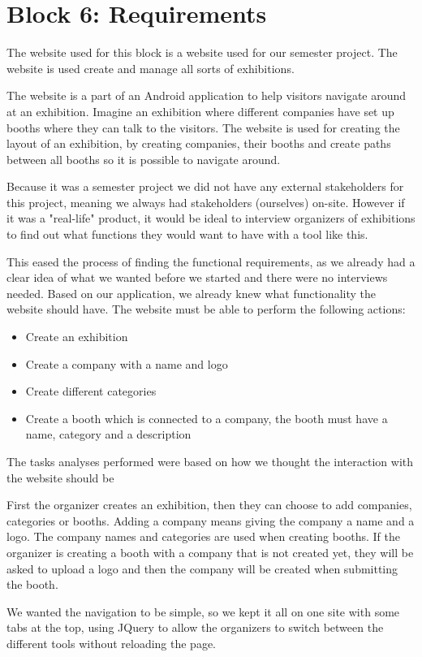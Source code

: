 \section*{Block 6: Requirements}

The website used for this block is a website used for our semester project. The website is used create and manage all sorts of exhibitions. 

The website is a part of an Android application to help visitors navigate around at an exhibition. Imagine an exhibition where different companies have set up booths where they can talk to the visitors. The website is used for creating the layout of an exhibition, by creating companies, their booths and create paths between all booths so it is possible to navigate around. 

Because it was a semester project we did not have any external stakeholders for this project, meaning we always had stakeholders (ourselves) on-site. However if it was a "real-life" product, it would be ideal to interview organizers of exhibitions to find out what functions they would want to have with a tool like this.

This eased the process of finding the functional requirements, as we already had a clear idea of what we wanted before we started and there were no interviews needed. Based on our application, we already knew what functionality the website should have. The website must be able to perform the following actions:

\begin{itemize}[noitemsep]
\item Create an exhibition
\item Create a company with a name and logo
\item Create different categories
\item Create a booth which is connected to a company, the booth must have a name, category and a description
\end{itemize}

The tasks analyses performed were based on how we thought the interaction with the website should be

First the organizer creates an exhibition, then they can choose to add companies, categories or booths. Adding a company means giving the company a name and a logo. The company names and categories are used when creating booths. If the organizer is creating a booth with a company that is not created yet, they will be asked to upload a logo and then the company will be created when submitting the booth.

We wanted the navigation to be simple, so we kept it all on one site with some tabs at the top, using JQuery to allow the organizers to switch between the different tools without reloading the page.